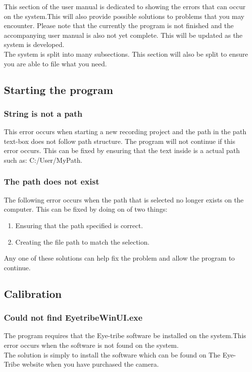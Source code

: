 This section of the user manual is dedicated to showing the errors that can occur on the system.This will also provide possible solutions to problems that you may encounter. Please note that the currently the program is not finished and the accompanying user manual is also not yet complete. This will be updated as the system is developed.\\

The system is split into many subsections. This section will also be split to ensure you are able to file what you need.

\subsection{Starting the program}
\subsubsection{String is not a path}
This error occurs when starting a new recording project and the path in the path text-box does not follow path structure. The program will not continue if this error occurs.
This can be fixed by ensuring that the text inside is a actual path such as: C:/User/MyPath.
\subsubsection{The path does not exist}
The following error occurs when the path that is selected no longer exists on the computer. This can be fixed by doing on of two things:\\
\begin{enumerate}
\item Ensuring that the path specified is correct.
\item Creating the file path to match the selection. 
\end{enumerate}
Any one of these solutions can help fix the problem and allow the program to continue.
\subsection{Calibration}
\subsubsection{Could not find EyetribeWinUI.exe}
The program requires that the Eye-tribe software be installed on the system.This error occurs when the software is not found on the system.\\
The solution is simply to install the software which can be found on The Eye-Tribe website when you have purchased the camera.
